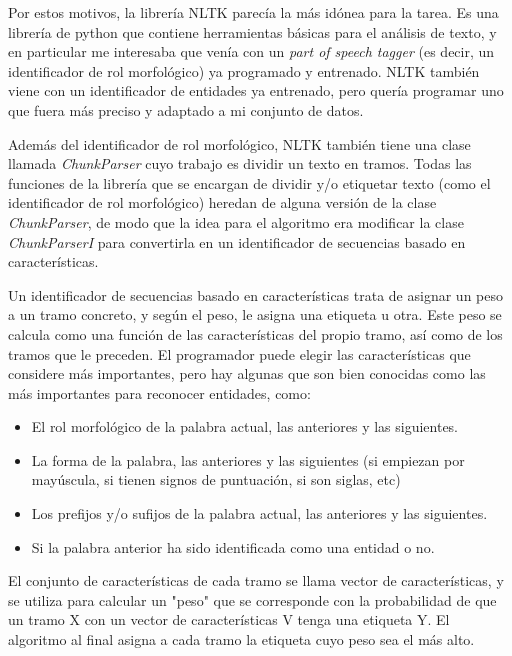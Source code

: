 \documentclass{pre-tfg}
\begin{document}
Por estos motivos, la librería NLTK parecía la más idónea para la tarea. Es una librería de python que contiene herramientas básicas para el análisis de texto, y en particular me interesaba que venía con un \textit{part of speech tagger} (es decir, un identificador de rol morfológico) ya programado y entrenado. NLTK también viene con un identificador de entidades ya entrenado, pero quería programar uno que fuera más preciso y adaptado a mi conjunto de datos.

Además del identificador de rol morfológico, NLTK también tiene una clase llamada \textit{ChunkParser} cuyo trabajo es dividir un texto en tramos. Todas las funciones de la librería que se encargan de dividir y/o etiquetar texto (como el identificador de rol morfológico) heredan de alguna versión de la clase \textit{ChunkParser}, de modo que la idea para el algoritmo era modificar la clase \textit{ChunkParserI} para convertirla en un identificador de secuencias basado en características.

Un identificador de secuencias basado en características trata de asignar un peso a un tramo concreto, y según el peso, le asigna una etiqueta u otra. Este peso se calcula como una función de las características del propio tramo, así como de los tramos que le preceden.
El programador puede elegir las características que considere más importantes, pero hay algunas que son bien conocidas como las más importantes para reconocer entidades, como:

\begin{itemize}
	\item El rol morfológico de la palabra actual, las anteriores y las siguientes.
	\item La forma de la palabra, las anteriores y las siguientes (si empiezan por mayúscula, si tienen signos de puntuación, si son siglas, etc)
	\item Los prefijos y/o sufijos de la palabra actual, las anteriores  y las siguientes.
	\item Si la palabra anterior ha sido identificada como una entidad o no.
	
\end{itemize}

El conjunto de características de cada tramo se llama vector de características, y se utiliza para calcular un "peso" que se corresponde con la probabilidad de que un tramo X con un vector de características V tenga una etiqueta Y. El algoritmo al final asigna a cada tramo la etiqueta cuyo peso sea el más alto.
\end{document}
